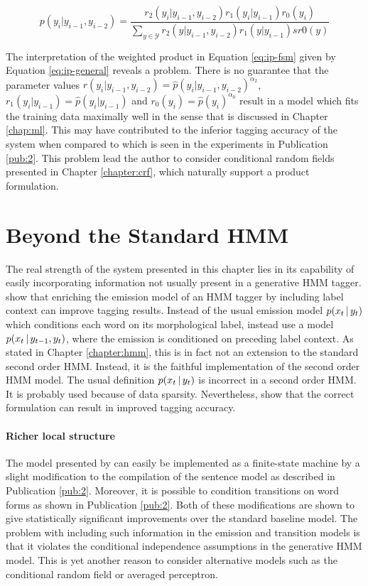\begin{equation}
p(y_i|y_{i-1}, y_{i-2}) = \frac{r_2(y_i|y_{i-1},y_{i-2})r_1(y_i|y_{i-1})r_0(y_i)}{\sum_{y\in\mathcal{Y}} r_2(y|y_{i-1},y_{i-2})r_1(y|y_{i-1})sr0(y)}\label{eq:ip-general}
\end{equation}

The interpretation of the weighted product in Equation \ref{eq:ip-fsm}
given by Equation \ref{eq:ip-general} reveals a problem. There is no
guarantee that the parameter values $r(y_i|y_{i-1},y_{i-2}) =
\hat{p}(y_i|y_{i-1},y_{i-2})^{\alpha_2}$, $r_1(y_i|y_{i-1}) =
\hat{p}(y_i|y_{i-1})$ and $r_0(y_i) = \hat{p}(y_i)^{\alpha_0}$ result
in a model which fits the training data maximally well in the sense
that is discussed in Chapter \ref{chap:ml}. This may have contributed
to the inferior tagging accuracy of the system when compared to
\cite{Brants2000} which is seen in the experiments in Publication
\ref{pub:2}. This problem lead the
author to consider conditional random fields presented in Chapter
\ref{chapter:crf}, which naturally support a product formulation.

\section{Beyond the Standard HMM}

The real strength of the system presented in this chapter lies in its
capability of easily incorporating information not usually present in
a generative HMM tagger. \cite{Halacsy2007} show that enriching the
emission model of an HMM tagger by including label context can improve
tagging results. Instead of the usual emission model $p(x_t\mbox{$ \, | \, $} y_t)$
which conditions each word on its morphological label,
\cite{Halacsy2007} instead use a model $p(x_t\mbox{$ \, | \, $} y_{t-1},y_t)$,
where the emission is conditioned on preceding label context. As
stated in Chapter \ref{chapter:hmm}, this is in fact not an extension
to the standard second order HMM. Instead, it is the faithful
implementation of the second order HMM model. The usual definition
$p(x_t\mbox{$ \, | \, $} y_t)$ is incorrect in a second order HMM. It is probably
used because of data sparsity. Nevertheless, \cite{Halacsy2007} show
that the correct formulation can result in improved tagging accuracy.

\paragraph{Richer local structure} The model presented by
\cite{Halascy2007} can easily be implemented as a finite-state machine
by a slight modification to the compilation of the sentence model as
described in Publication \ref{pub:2}. Moreover, it is possible to
condition transitions on word forms as shown in Publication
\ref{pub:2}. Both of these modifications are shown to give
statistically significant improvements over the standard baseline
model. The problem with including such information in the emission and
transition models is that it violates the conditional independence
assumptions in the generative HMM model. This is yet another reason to
consider alternative models such as the conditional random field or
averaged perceptron.

